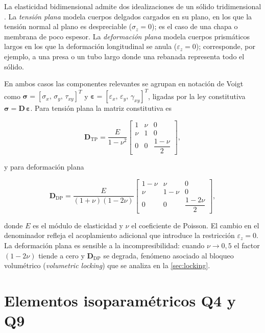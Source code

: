 La elasticidad bidimensional admite dos idealizaciones de un sólido tridimensional \autocite{timoshenko1970elasticity,cook2002concepts}. La \emph{tensión plana} modela cuerpos delgados cargados en su plano, en los que la tensión normal al plano es despreciable ($\sigma_z = 0$); es el caso de una chapa o membrana de poco espesor. La \emph{deformación plana} modela cuerpos prismáticos largos en los que la deformación longitudinal se anula ($\varepsilon_z = 0$); corresponde, por ejemplo, a una presa o un tubo largo donde una rebanada representa todo el sólido.

En ambos casos las componentes relevantes se agrupan en notación de Voigt como $\bm{\sigma} = [\sigma_x,\, \sigma_y,\, \tau_{xy}]^T$ y $\bm{\varepsilon} = [\varepsilon_x,\, \varepsilon_y,\, \gamma_{xy}]^T$, ligadas por la ley constitutiva $\bm{\sigma} = \bm{D}\,\bm{\varepsilon}$. Para tensión plana la matriz constitutiva es

\begin{equation}
\bm{D}_{\text{TP}} = \frac{E}{1-\nu^{2}}
\begin{bmatrix}
1 & \nu & 0 \\
\nu & 1 & 0 \\
0 & 0 & \dfrac{1-\nu}{2}
\end{bmatrix},
\label{eq:D-tension-plana}
\end{equation}

y para deformación plana

\begin{equation}
\bm{D}_{\text{DP}} = \frac{E}{(1+\nu)(1-2\nu)}
\begin{bmatrix}
1-\nu & \nu & 0 \\
\nu & 1-\nu & 0 \\
0 & 0 & \dfrac{1-2\nu}{2}
\end{bmatrix},
\label{eq:D-deformacion-plana}
\end{equation}

donde $E$ es el módulo de elasticidad y $\nu$ el coeficiente de Poisson. El cambio en el denominador refleja el acoplamiento adicional que introduce la restricción $\varepsilon_z = 0$. La deformación plana es sensible a la incompresibilidad: cuando $\nu \to 0{,}5$ el factor $(1-2\nu)$ tiende a cero y $\bm{D}_{\text{DP}}$ se degrada, fenómeno asociado al bloqueo volumétrico (\emph{volumetric locking}) que se analiza en la \autoref{sec:locking}.

\section{Elementos isoparamétricos Q4 y Q9}
\label{sec:isoparametricos}

